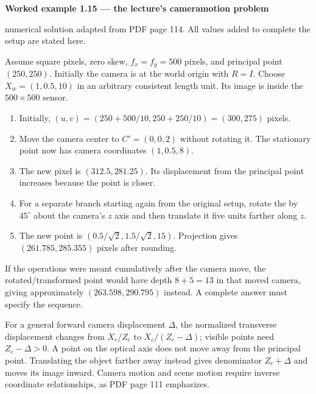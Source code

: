 \documentclass[letterpaper,11pt,english,openany,oneside]{jupyterBook}
\begin{document}
\begin{TextbookBox}
\textbf{Worked example 1.15 — the lecture’s camera\sphinxhyphen{}motion problem}\par\smallskip

\sphinxAtStartPar
{} numerical solution adapted from PDF page 114. All values added to complete the setup are stated here.

\sphinxAtStartPar
Assume square pixels, zero skew, \(f_x=f_y=500\) pixels, and principal point \((250,250)\). Initially the camera is at the world origin with \(R=I\). Choose \(X_w=(1,0.5,10)\) in an arbitrary consistent length unit. Its image is inside the \(500\times500\) sensor.
\begin{enumerate}
%
\item {}
\sphinxAtStartPar
Initially, \((u,v)=(250+500/10,250+250/10)=(300,275)\) pixels.

\item {}
\sphinxAtStartPar
Move the camera center to \(C'=(0,0,2)\) without rotating it. The stationary point now has camera coordinates \((1,0.5,8)\).

\item {}
\sphinxAtStartPar
The new pixel is \((312.5,281.25)\). Its displacement from the principal point increases because the point is closer.

\item {}
\sphinxAtStartPar
For a separate branch starting again from the original setup, rotate the  by \(45^\circ\) about the camera’s \(z\) axis and then translate it five units farther along \(z\).

\item {}
\sphinxAtStartPar
The new point is \((0.5/\sqrt2,1.5/\sqrt2,15)\). Projection gives \((261.785,285.355)\) pixels after rounding.

\end{enumerate}

\sphinxAtStartPar
If the operations were meant cumulatively after the camera move, the rotated/transformed point would have depth \(8+5=13\) in that moved camera, giving approximately \((263.598,290.795)\) instead. A complete answer must specify the sequence.

\end{TextbookBox}

\sphinxAtStartPar
For a general forward camera displacement \(\Delta\), the normalized transverse displacement changes from \(X_c/Z_c\) to \(X_c/(Z_c-\Delta)\); visible points need \(Z_c-\Delta>0\). A point on the optical axis does not move away from the principal point. Translating the object farther away instead gives denominator \(Z_c+\Delta\) and moves its image inward. Camera motion and scene motion require inverse coordinate relationships, as PDF page 111 emphasizes.
\end{document}
